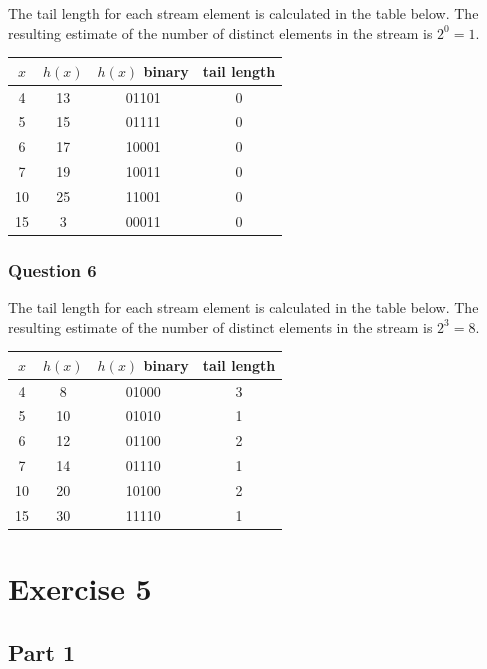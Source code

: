 \documentclass[12t]{article}
\begin{document}
	The tail length for each stream element is calculated in the table below. The resulting estimate of the number of distinct elements in the stream is $2^{0}=1$.\\
	
	\begin{tabular}{cccc}
	$x$ & $h(x)$ & $h(x)$ binary & tail length \\
	\hline
	4 & 13 & 01101 & 0 \\
	5 & 15 & 01111 & 0 \\
	6 & 17 & 10001 & 0 \\
	7 & 19 & 10011 & 0 \\
	10 & 25 & 11001 & 0 \\
	15 & 3 & 00011 & 0 \\
	\hline
	\end{tabular}

	\subsubsection*{Question 6}
	
	The tail length for each stream element is calculated in the table below. The resulting estimate of the number of distinct elements in the stream is $2^{3}=8$.\\

	\begin{tabular}{cccc}
	$x$ & $h(x)$ & $h(x)$ binary & tail length \\
	\hline
	4 & 8 & 01000 & 3 \\
	5 & 10 & 01010 & 1 \\
	6 & 12 & 01100 & 2 \\
	7 & 14 & 01110 & 1 \\
	10 & 20 & 10100 & 2 \\
	15 & 30 & 11110 & 1 \\
	\hline
	\end{tabular}
	
	\newpage	
	
	\section*{Exercise 5}
	
	\subsection*{Part 1}
	
\end{document}

